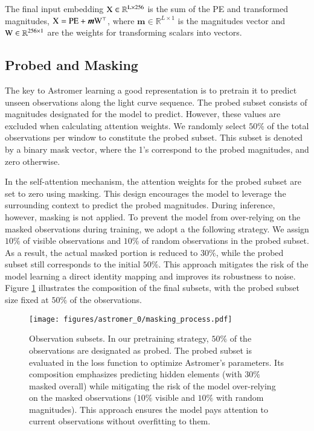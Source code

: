 The final input embedding $\rm{X}\in\mathbb{R}^{L\times 256}$ is the sum of the PE and transformed magnitudes, $\rm{X} = PE + \boldsymbol{m}\rm{W}^{\top}$, where $\boldsymbol{m} \in \mathbb{R}^{L\times 1}$ is the magnitudes vector and $\rm{W} \in \mathbb{R}^{256\times 1}$ are the weights for transforming scalars into vectors.

\subsection{Probed and Masking}
The key to Astromer learning a good representation is to pretrain it to predict unseen observations along the light curve sequence. The probed subset consists of magnitudes designated for the model to predict. However, these values are excluded when calculating attention weights. We randomly select $50\%$ of the total observations per window to constitute the probed subset. This subset is denoted by a binary mask vector, where the 1's correspond to the probed magnitudes, and zero otherwise.

In the self-attention mechanism, the attention weights for the probed subset are set to zero using masking. This design encourages the model to leverage the surrounding context to predict the probed magnitudes. During inference, however, masking is not applied. To prevent the model from over-relying on the masked observations during training, we adopt a the following strategy. We assign $10\%$ of visible observations and $10\%$ of random observations in the probed subset. As a result, the actual masked portion is reduced to $30\%$, while the probed subset still corresponds to the initial $50\%$. This approach mitigates the risk of the model learning a direct identity mapping and improves its robustness to noise. Figure \ref{fig:probed_masking} illustrates the composition of the final subsets,  with the probed subset size fixed at $50\%$ of the observations.
\begin{figure}[!ht]
    \centering
    \texttt{[image: figures/astromer\_0/masking\_process.pdf]}
    \caption{Observation subsets. In our pretraining strategy, $50\%$ of the observations are designated as probed. The probed subset is evaluated in the loss function to optimize Astromer's parameters. Its composition emphasizes predicting hidden elements (with $30\%$ masked overall) while mitigating the risk of the model over-relying on the masked observations ($10\%$ visible and $10\%$ with random magnitudes). This approach ensures the model pays attention to current observations without overfitting to them.}
    \label{fig:probed_masking}
\end{figure}


